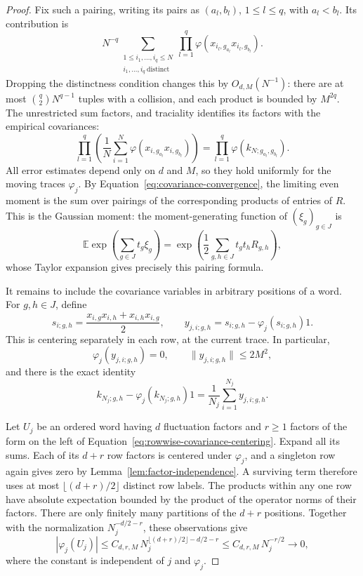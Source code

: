 \begin{proof}
Fix such a pairing, writing its pairs as
\((a_l,b_l)\), \(1\leq l\leq q\), with \(a_l<b_l\).
Its contribution is
\[
 N^{-q}
 \sum_{\substack{1\leq i_1,\ldots,i_q\leq N\\
                  i_1,\ldots,i_q\ \mathrm{distinct}}}
 \prod_{l=1}^q
 \varphi(x_{i_l,g_{a_l}}x_{i_l,g_{b_l}}).
\]
Dropping the distinctness condition changes this by
\(O_{d,M}(N^{-1})\): there are at most
\(\binom q2 N^{q-1}\) tuples with a collision, and each
product is bounded by \(M^{2q}\).
The unrestricted sum factors, and traciality identifies
its factors with the empirical covariances:
\[
 \prod_{l=1}^q
 \left(\frac1N\sum_{i=1}^N
 \varphi(x_{i,g_{a_l}}x_{i,g_{b_l}})\right)
 =
 \prod_{l=1}^q\varphi(k_{N;g_{a_l},g_{b_l}}).
\]
All error estimates depend only on \(d\) and \(M\), so they
hold uniformly for the moving traces \(\varphi_j\).
By Equation~\eqref{eq:covariance-convergence}, the limiting even
moment is the sum over pairings of the corresponding
products of entries of \(R\). This is the Gaussian moment:
the moment-generating function of \((\xi_g)_{g\in J}\) is
\[
 \mathbb E\exp\!\left(\sum_{g\in J}t_g\xi_g\right)
 =
 \exp\!\left(\frac12\sum_{g,h\in J}t_gt_hR_{g,h}\right),
\]
whose Taylor expansion gives precisely this pairing formula.

It remains to include the covariance variables in arbitrary
positions of a word. For \(g,h\in J\), define
\[
 s_{i;g,h}=\frac{x_{i,g}x_{i,h}+x_{i,h}x_{i,g}}2,
 \qquad
 y_{j,i;g,h}=s_{i;g,h}-\varphi_j(s_{i;g,h})1.
\]
This is centering separately in each row, at the current
trace. In particular,
\[
 \varphi_j(y_{j,i;g,h})=0,\qquad
 \|y_{j,i;g,h}\|\leq2M^2,
\]
and there is the exact identity
\begin{equation}
\label{eq:rowwise-covariance-centering}
 k_{N_j;g,h}-\varphi_j(k_{N_j;g,h})1
 =\frac1{N_j}\sum_{i=1}^{N_j}y_{j,i;g,h}.
\end{equation}

Let \(U_j\) be an ordered word having \(d\) fluctuation factors
and \(r\geq1\) factors of the form on the left of
Equation~\eqref{eq:rowwise-covariance-centering}. Expand all its sums.
Each of its \(d+r\) row factors is centered under
\(\varphi_j\), and a singleton row again gives zero by
Lemma~\ref{lem:factor-independence}. A surviving term therefore
uses at most \(\lfloor(d+r)/2\rfloor\) distinct row labels.
The products within any one row have absolute expectation
bounded by the product of the operator norms of their
factors. There are only finitely many partitions of the
\(d+r\) positions. Together with the normalization
\(N_j^{-d/2-r}\), these observations give
\begin{equation}
\label{eq:centered-mixed-word-bound}
 \left|\varphi_j(U_j)\right|
 \leq C_{d,r,M}\,
 N_j^{\lfloor(d+r)/2\rfloor-d/2-r}
 \leq C_{d,r,M}\,N_j^{-r/2}
 \longrightarrow0,
\end{equation}
where the constant is independent of \(j\) and
\(\varphi_j\).


\end{proof}
